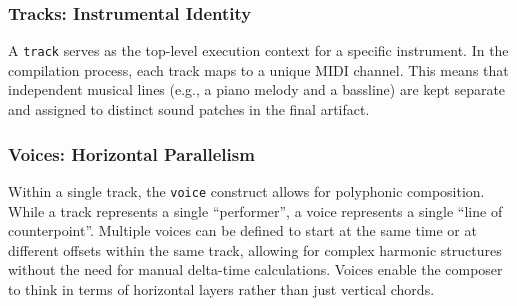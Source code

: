 \subsubsection{Tracks: Instrumental Identity}
A \texttt{track} serves as the top-level execution context for a specific instrument.
In the compilation process, each track maps to a unique MIDI channel.
This means that independent musical lines (e.g., a piano melody and a bassline) are kept separate and assigned to
distinct sound patches in the final artifact.

\subsubsection{Voices: Horizontal Parallelism}
Within a single track, the \texttt{voice} construct allows for polyphonic composition.
While a track represents a single ``performer'', a voice represents a single ``line of counterpoint''.
Multiple voices can be defined to start at the same time or at different offsets within the same track, allowing for
complex harmonic structures without the need for manual delta-time calculations.
Voices enable the composer to think in terms of horizontal layers rather than just vertical chords.
